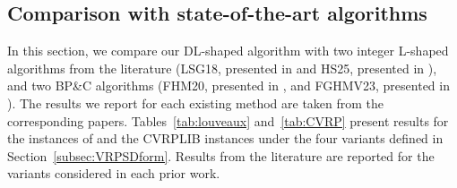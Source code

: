 \documentclass{article}
\newcommand{\rev}[1]{{\color{black}#1}}
\begin{document}
\subsection{Comparison with state-of-the-art algorithms} \label{sec:experiments:existing}

In this section, we compare our DL-shaped algorithm with two integer L-shaped algorithms from the literature (LSG18, presented in \cite{louveaux2018exact} and HS25, presented in \cite{hoogendoorn2025evaluation}), and \rev{two BP\&C algorithms (FHM20, presented in \cite{florio2020new}, and FGHMV23, presented in \cite{florio2023recent}).} The results we report for each existing method are taken from the corresponding papers. Tables~\ref{tab:louveaux} and~\ref{tab:CVRP} present results for the instances of \cite{louveaux2018exact} and the CVRPLIB instances under the four variants defined in Section~\ref{subsec:VRPSDform}. Results from the literature are reported for the variants considered in each prior work.
\end{document}
